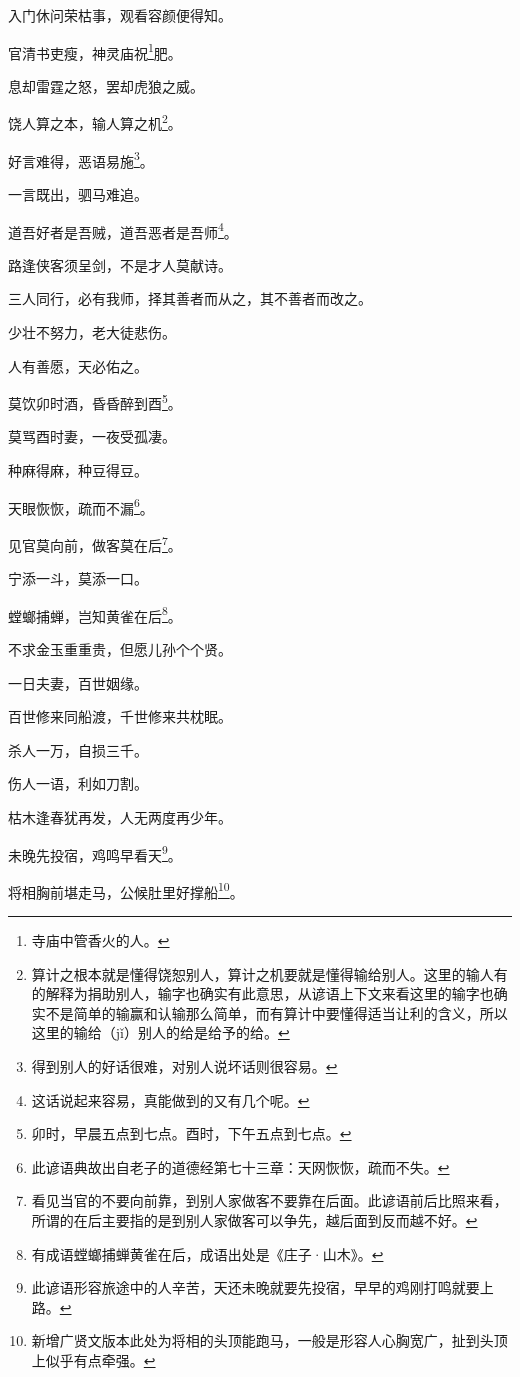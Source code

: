 \documentclass[12pt,oneside]{book}
\begin{document}
入门休问荣枯事，观看容颜便得知。

官清书吏瘦，神灵庙祝\footnote{寺庙中管香火的人。}肥。

息却雷霆之怒，罢却虎狼之威。

饶人算之本，输人算之机\footnote{算计之根本就是懂得饶恕别人，算计之机要就是懂得输给别人。这里的输人有的解释为捐助别人，输字也确实有此意思，从谚语上下文来看这里的输字也确实不是简单的输赢和认输那么简单，而有算计中要懂得适当让利的含义，所以这里的输给（jǐ）别人的给是给予的给。}。

好言难得，恶语易施\footnote{得到别人的好话很难，对别人说坏话则很容易。}。

一言既出，驷马难追。

道吾好者是吾贼，道吾恶者是吾师\footnote{这话说起来容易，真能做到的又有几个呢。}。

路逢侠客须呈剑，不是才人莫献诗。

三人同行，必有我师，择其善者而从之，其不善者而改之。

少壮不努力，老大徒悲伤。

人有善愿，天必佑之。

莫饮卯时酒，昏昏醉到酉\footnote{卯时，早晨五点到七点。酉时，下午五点到七点。}。

莫骂酉时妻，一夜受孤凄。

种麻得麻，种豆得豆。

天眼恢恢，疏而不漏\footnote{此谚语典故出自老子的道德经第七十三章：天网恢恢，疏而不失。}。

见官莫向前，做客莫在后\footnote{看见当官的不要向前靠，到别人家做客不要靠在后面。此谚语前后比照来看，所谓的在后主要指的是到别人家做客可以争先，越后面到反而越不好。}。

宁添一斗，莫添一口。

螳螂捕蝉，岂知黄雀在后\footnote{有成语螳螂捕蝉黄雀在后，成语出处是《庄子·山木》。}。

不求金玉重重贵，但愿儿孙个个贤。

一日夫妻，百世姻缘。

百世修来同船渡，千世修来共枕眠。

杀人一万，自损三千。

伤人一语，利如刀割。

枯木逢春犹再发，人无两度再少年。

未晚先投宿，鸡鸣早看天\footnote{此谚语形容旅途中的人辛苦，天还未晚就要先投宿，早早的鸡刚打鸣就要上路。}。

将相胸前堪走马，公候肚里好撑船\footnote{新增广贤文版本此处为将相的头顶能跑马，一般是形容人心胸宽广，扯到头顶上似乎有点牵强。}。
\end{document}
